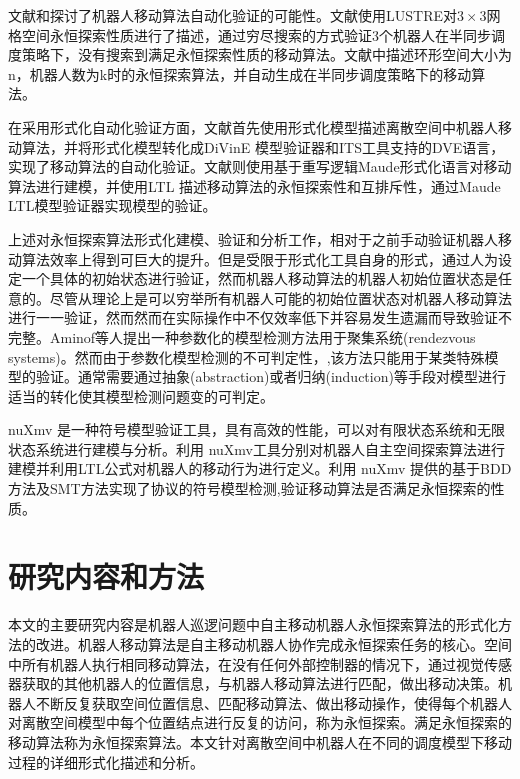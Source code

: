 文献\cite{r13}和\cite{r14}探讨了机器人移动算法自动化验证的可能性。文献\cite{r13}使用LUSTRE\cite{r15}对$3\times3$网格空间永恒探索性质进行了描述，通过穷尽搜索的方式验证3个机器人在半同步调度策略下，没有搜索到满足永恒探索性质的移动算法。文献\cite{r14}中描述环形空间大小为n，机器人数为k时的永恒探索算法，并自动生成在半同步调度策略下的移动算法。

在采用形式化自动化验证方面，文献\cite{r16}首先使用形式化模型描述离散空间中机器人移动算法，并将形式化模型转化成DiVinE 模型验证器\cite{r17}和ITS工具\cite{r18}支持的DVE语言，实现了移动算法的自动化验证。文献\cite{r19}则使用基于重写逻辑Maude形式化语言对移动算法进行建模，并使用LTL 描述移动算法的永恒探索性和互排斥性，通过Maude LTL模型验证器\cite{r20}\cite{r21}\cite{r22}实现模型的验证。

上述对永恒探索算法形式化建模、验证和分析工作，相对于之前手动验证机器人移动算法效率上得到可巨大的提升。但是受限于形式化工具自身的形式，通过人为设定一个具体的初始状态进行验证，然而机器人移动算法的机器人初始位置状态是任意的。尽管从理论上是可以穷举所有机器人可能的初始位置状态对机器人移动算法进行一一验证，然而然而在实际操作中不仅效率低下并容易发生遗漏而导致验证不完整。Aminof等人提出一种参数化的模型检测方法用于聚集系统(rendezvous systems)\cite{r23}。然而由于参数化模型检测的不可判定性\cite{r24}，,该方法只能用于某类特殊模型的验证。通常需要通过抽象(abstraction)或者归纳(induction)等手段对模型进行适当的转化使其模型检测问题变的可判定\cite{r25}\cite{r26}。

nuXmv\cite{r27} 是一种符号模型验证工具，具有高效的性能，可以对有限状态系统和无限状态系统进行建模与分析。利用 nuXmv工具分别对机器人自主空间探索算法进行建模并利用LTL公式对机器人的移动行为进行定义。利用 nuXmv 提供的基于BDD方法\cite{r28}及SMT方法\cite{r28}实现了协议的符号模型检测,验证移动算法是否满足永恒探索的性质。

\section{研究内容和方法}
本文的主要研究内容是机器人巡逻问题中自主移动机器人永恒探索算法的形式化方法的改进。机器人移动算法是自主移动机器人协作完成永恒探索任务的核心。空间中所有机器人执行相同移动算法，在没有任何外部控制器的情况下，通过视觉传感器获取的其他机器人的位置信息，与机器人移动算法进行匹配，做出移动决策。机器人不断反复获取空间位置信息、匹配移动算法、做出移动操作，使得每个机器人对离散空间模型中每个位置结点进行反复的访问，称为永恒探索。满足永恒探索的移动算法称为永恒探索算法。本文针对离散空间中机器人在不同的调度模型下移动过程的详细形式化描述和分析。

